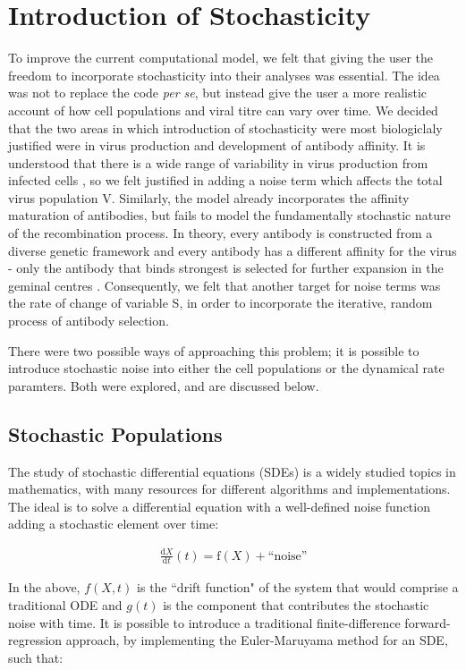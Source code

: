 \documentclass[a4paper, 12pt]{report}
\begin{document}
\section{Introduction of Stochasticity} %
To improve the current computational model, we felt that giving the user the freedom to incorporate stochasticity into their analyses was essential. The idea was not to replace the code \emph{per se}, but instead give the user a more realistic account of how cell populations and viral titre can vary over time. We decided that the two areas in which introduction of stochasticity were most biologiclaly justified were in virus production and development of antibody affinity. It is understood that there is a wide range of variability in virus production from infected cells \cite{MitchellJanuary152011}, so we felt justified in adding a noise term which affects the total virus population V. Similarly, the model already incorporates the affinity maturation of antibodies, but fails to model the fundamentally stochastic nature of the recombination process. In theory, every antibody is constructed from a diverse genetic framework and every antibody has a different affinity for the virus - only the antibody that binds strongest is selected for further expansion in the geminal centres \cite{Grimaldi15022005}. Consequently, we felt that another target for noise terms was the rate of change of variable S, in order to incorporate the iterative, random process of antibody selection.

There were two possible ways of approaching this problem; it is possible to introduce stochastic noise into either the cell populations or the dynamical rate paramters. Both were explored, and are discussed below.

\subsection{Stochastic Populations}

The study of stochastic differential equations (SDEs) is a widely studied topics in mathematics, with many resources for different algorithms and implementations. The ideal is to solve a differential equation with a well-defined noise function adding a stochastic element over time:

\begin{align}
\frac{\mathrm d X}{\mathrm d t}(t) = \mathrm f (X) + \text{``noise''}
\end{align}

In the above, $f(X,t)$ is the ``drift function" of the system that would comprise a traditional ODE and $g(t)$ is the component that contributes the stochastic noise with time. It is possible to introduce a traditional finite-difference forward-regression approach, by implementing the Euler-Maruyama method for an SDE, such that:
\end{document}
